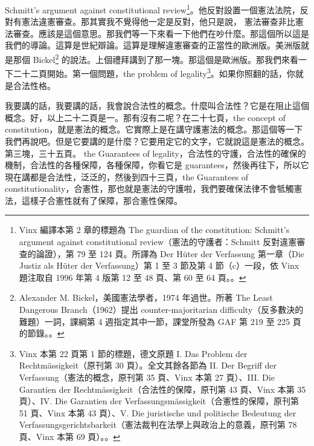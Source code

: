 \hypertarget{w05:cue:24}{}Schmitt's argument against constitutional review\footnote{Vinx 編譯本第 2 章的標題為 The guardian of the constitution: Schmitt's argument against constitutional review（憲法的守護者：Schmitt 反對違憲審查的論證），第 79 至 124 頁。所譯為 Der Hüter der Verfassung 第一章（Die Justiz als Hüter der Verfassung）第 1 至 3 節及第 4 節（c）一段，依 Vinx 題注取自 1996 年第 4 版第 12 至 48 頁、第 60 至 64 頁。\cite{schmitt2015}。}。他反對設置一個憲法法院，反對有憲法違憲審查。那其實我不覺得他一定是反對，他只是說，
\hypertarget{w05:cue:25}{}憲法審查非比憲法審查。應該是這個意思。那我們等一下來看一下他們在吵什麼。那這個所以這是我們的導論。這算是世紀辯論。這算是理解違憲審查的正當性的歐洲版。美洲版就是那個 Bickel\footnote{Alexander M. Bickel，美國憲法學者，1974 年過世。所著 The Least Dangerous Branch（1962）提出 counter-majoritarian difficulty（反多數決的難題）一詞，課綱第 4 週指定其中一節，課堂所發為 GAF 第 219 至 225 頁的節錄。\cite{bickel2004}。} 的說法。上個禮拜講到了那一塊。那這個是歐洲版。那我們來看一下二十二頁開始。第一個問題，the problem of legality\footnote{Vinx 本第 22 頁第 1 節的標題，德文原題 I. Das Problem der Rechtmässigkeit（原刊第 30 頁）。全文其餘各節為 II. Der Begriff der Verfassung（憲法的概念，原刊第 35 頁、Vinx 本第 27 頁）、III. Die Garantien der Rechtmässigkeit（合法性的保障，原刊第 43 頁、Vinx 本第 35 頁）、IV. Die Garantien der Verfassungsmässigkeit（合憲性的保障，原刊第 51 頁、Vinx 本第 43 頁）、V. Die juristische und politische Bedeutung der Verfassungsgerichtsbarkeit（憲法裁判在法學上與政治上的意義，原刊第 78 頁、Vinx 本第 69 頁）。\cite{kelsen1929}。}。如果你照翻的話，你就是合法性格。

\hypertarget{w05:cue:26}{}我要講的話，我要講的話，我會說合法性的概念。什麼叫合法性？它是在阻止這個概念。好，以上二十二頁是一。那有沒有二呢？在二十七頁，the concept of constitution，就是憲法的概念。它實際上是在講守護憲法的概念。那這個等一下我們再說吧。但是它要講的是什麼？它要用定它的文字，它就說這是憲法的概念。第三塊，三十五頁。
\hypertarget{w05:cue:27}{}the Guarantees of legality，合法性的守護，合法性的確保的機制，合法性的各種保障，各種保障，你看它是 guarantees，然後再往下，所以它現在講都是合法性，泛泛的，然後到四十三頁，the Guarantees of constitutionality，合憲性，那也就是憲法的守護啦，我們要確保法律不會牴觸憲法，這樣子合憲性就有了保障，那合憲性保障。

